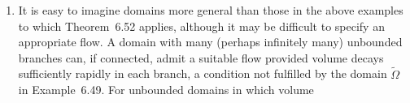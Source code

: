\begin{remarks}
  \begin{enumerate}[1.]
    \item It is easy to imagine domains more general than those in the above examples
      to which Theorem~6.52 applies, although it may be difficult to specify
      an appropriate flow. A domain with many (perhaps infinitely many)
      unbounded branches can, if connected, admit a suitable flow provided
      volume decays sufficiently rapidly in each branch, a condition
      not fulfilled by the domain $\tilde\Omega$ in Example~6.49.
      For unbounded domains in which volume
  \end{enumerate}
\end{remarks}